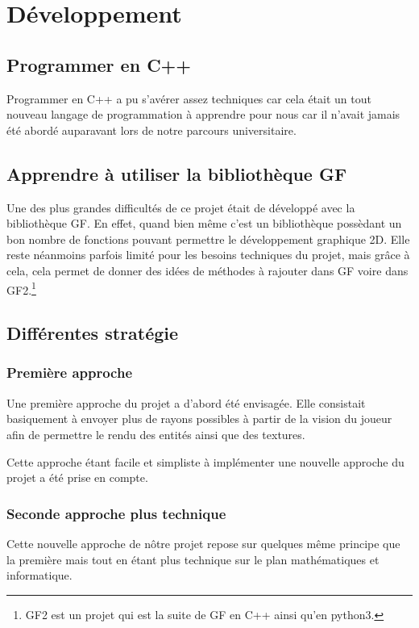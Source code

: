 \documentclass[12pt]{report}
\begin{document}
\section{Développement}
\subsection{Programmer en C++}

Programmer en C++ a pu s'avérer assez techniques car cela était un tout nouveau
langage de programmation à apprendre pour nous car il n'avait jamais été abordé
auparavant lors de notre parcours universitaire.

\subsection{Apprendre à utiliser la bibliothèque GF}

Une des plus grandes difficultés de ce projet était de développé avec la bibliothèque
GF. En effet, quand bien même c'est un bibliothèque possèdant un bon nombre de 
fonctions pouvant permettre le développement graphique 2D. Elle reste néanmoins
parfois limité pour les besoins techniques du projet, mais grâce à cela, cela permet
de donner des idées de méthodes à rajouter dans GF voire dans GF2.\footnote{GF2 est un projet
qui est la suite de GF en C++ ainsi qu'en python3.}


\subsection{Différentes stratégie}
\subsubsection{Première approche}

Une première approche du projet a d'abord été envisagée. Elle consistait 
basiquement à envoyer plus de rayons possibles à partir de la vision du joueur
afin de permettre le rendu des entités ainsi que des textures.

Cette approche étant facile et simpliste à implémenter une nouvelle approche
du projet a été prise en compte.

\subsubsection{Seconde approche plus technique}

Cette nouvelle approche de nôtre projet repose sur quelques même principe que
la première mais tout en étant plus technique sur le plan mathématiques et informatique.
\end{document}
